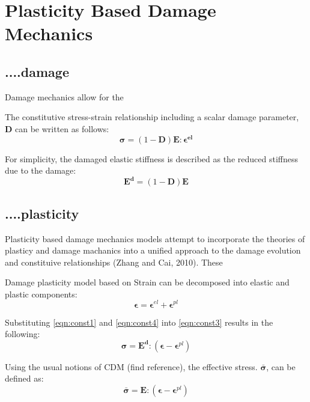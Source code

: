 \section{Plasticity Based Damage Mechanics}


\subsection{....damage}

Damage mechanics allow for the 

The constitutive stress-strain relationship including a scalar damage
parameter, $\mathbf{D}$ can be written as follows: 
\begin{equation}
\boldsymbol{\sigma}=(1-\mathbf{D})\mathbf{E}:\boldsymbol{\epsilon^{el}}\label{eqn:const3}
\end{equation}


For simplicity, the damaged elastic stiffness is described as the
reduced stiffness due to the damage: 
\begin{equation}
\mathbf{E^{d}}=(1-\mathbf{D})\mathbf{E}\label{eqn:const4}
\end{equation}



\subsection{....plasticity}

Plasticity based damage mechanics models attempt to incorporate the
theories of plasticy and damage machanics into a unified approach
to the damage evolution and constituive relationships (Zhang and Cai,
2010). These 

Damage plasticity model based on Strain can be decomposed into elastic
and plastic components: 
\begin{equation}
\boldsymbol{\epsilon}=\boldsymbol{\epsilon}^{el}+\boldsymbol{\epsilon}^{pl}\label{eqn:const1}
\end{equation}


Substituting \ref{eqn:const1} and \ref{eqn:const4} into \ref{eqn:const3}
results in the following: 
\begin{equation}
\boldsymbol{\sigma}=\mathbf{E^{d}}:(\boldsymbol{\epsilon}-\boldsymbol{\epsilon}^{pl})\label{eqn:const5}
\end{equation}


Using the \textquotedbl{}usual notions of CDM\textquotedbl{} (find
reference), the effective stress. $\boldsymbol{\bar{\sigma}}$, can
be defined as: 
\begin{equation}
\boldsymbol{\bar{\sigma}}=\mathbf{E}:(\boldsymbol{\epsilon}-\boldsymbol{\epsilon}^{pl})\label{eqn:const6}
\end{equation}


